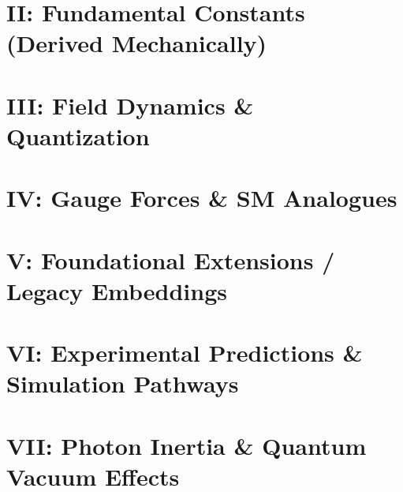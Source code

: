 \documentclass[12pt]{article}
\begin{document}
        \newpage\chapter*{II: Fundamental Constants (Derived Mechanically)}
        
        
        
        
        
        

        \newpage\chapter*{III: Field Dynamics \& Quantization}

        

        \newpage\chapter*{IV: Gauge Forces \& SM Analogues}
        

        \newpage\chapter*{V: Foundational Extensions / Legacy Embeddings}
        

        \newpage\chapter*{VI: Experimental Predictions \& Simulation Pathways}
        

        \newpage\chapter*{VII: Photon Inertia \& Quantum Vacuum Effects}
        
        
        

    
    
\end{document}
